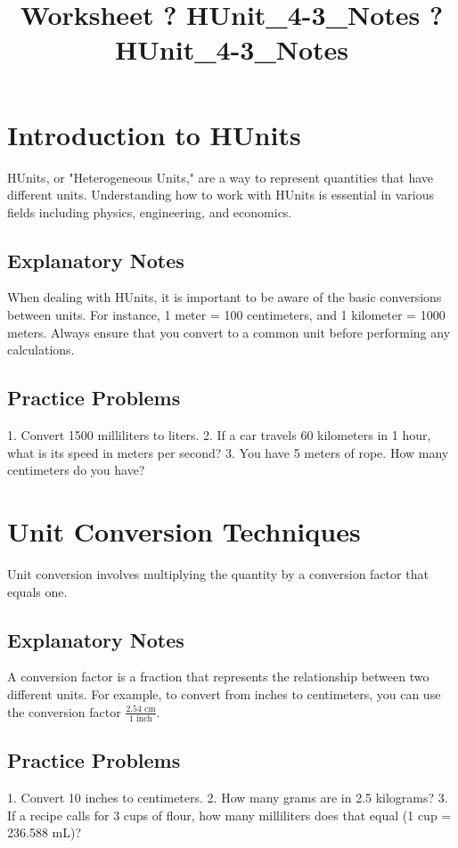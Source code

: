 \documentclass{article}
\title{Worksheet ? HUnit\_4-3\_Notes ? HUnit\_4-3\_Notes}
\author{}
\date{}
\begin{document}
\maketitle

\section*{Introduction to HUnits}
HUnits, or "Heterogeneous Units," are a way to represent quantities that have different units. Understanding how to work with HUnits is essential in various fields including physics, engineering, and economics.

\subsection*{Explanatory Notes}
When dealing with HUnits, it is important to be aware of the basic conversions between units. For instance, 1 meter = 100 centimeters, and 1 kilometer = 1000 meters. Always ensure that you convert to a common unit before performing any calculations.

\subsection*{Practice Problems}
1. Convert 1500 milliliters to liters.
2. If a car travels 60 kilometers in 1 hour, what is its speed in meters per second?
3. You have 5 meters of rope. How many centimeters do you have?

\section*{Unit Conversion Techniques}
Unit conversion involves multiplying the quantity by a conversion factor that equals one.

\subsection*{Explanatory Notes}
A conversion factor is a fraction that represents the relationship between two different units. For example, to convert from inches to centimeters, you can use the conversion factor \( \frac{2.54 \text{ cm}}{1 \text{ inch}} \).

\subsection*{Practice Problems}
1. Convert 10 inches to centimeters.
2. How many grams are in 2.5 kilograms?
3. If a recipe calls for 3 cups of flour, how many milliliters does that equal (1 cup = 236.588 mL)?
\end{document}
